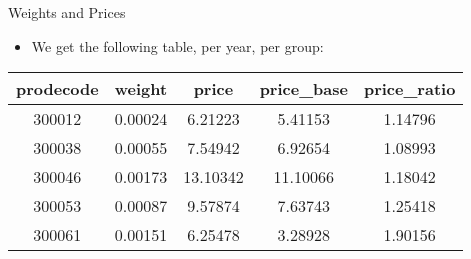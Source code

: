 \documentclass{beamer}
\begin{document}
\begin{frame}{Weights and Prices}
    \begin{itemize}
        \item We get the following table, per year, per group:
    \end{itemize}
    \begin{tabular}{c c c c c}
        \hline
        \textbf{prodecode} & \textbf{weight} & \textbf{price} & \textbf{price\_base} & \textbf{price\_ratio} \\
        \hline
        300012             & 0.00024         & 6.21223        & 5.41153              & 1.14796               \\
        \hline
        300038             & 0.00055         & 7.54942        & 6.92654              & 1.08993               \\
        \hline
        300046             & 0.00173         & 13.10342       & 11.10066             & 1.18042               \\
        \hline
        300053             & 0.00087         & 9.57874        & 7.63743              & 1.25418               \\
        \hline
        300061             & 0.00151         & 6.25478        & 3.28928              & 1.90156               \\
        \hline
    \end{tabular}
\end{frame}
\end{document}
